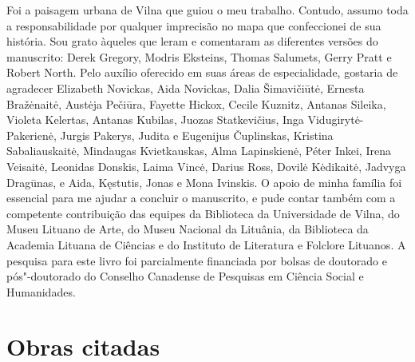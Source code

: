 Foi a paisagem urbana de Vilna que guiou o meu trabalho. Contudo, assumo
toda a responsabilidade por qualquer imprecisão no mapa que confeccionei
de sua história. Sou grato àqueles que leram e comentaram as diferentes
versões do manuscrito: Derek Gregory, Modris Eksteins, Thomas Salumets,
Gerry Pratt e Robert North. Pelo auxílio oferecido em suas áreas de
especialidade, gostaria de agradecer Elizabeth Novickas, Aida Novickas,
Dalia Šimavičiūtė, Ernesta Bražėnaitė, Austėja Pečiūra, Fayette Hickox,
Cecile Kuznitz, Antanas Sileika, Violeta Kelertas, Antanas Kubilas,
Juozas Statkevičius, Inga Vidugirytė-Pakerienė, Jurgis Pakerys, Judita e
Eugenijus Čuplinskas, Kristina Sabaliauskaitė, Mindaugas Kvietkauskas,
Alma Lapinskienė, Péter Inkei, Irena Veisaitė, Leonidas Donskis, Laima
Vincė, Darius Ross, Dovilė Kėdikaitė, Jadvyga Dragūnas, e Aida,
Kęstutis, Jonas e Mona Ivinskis. O apoio de minha família foi essencial
para me ajudar a concluir o manuscrito, e pude contar também com a
competente contribuição das equipes da Biblioteca da Universidade de
Vilna, do Museu Lituano de Arte, do Museu Nacional da Lituânia, da
Biblioteca da Academia Lituana de Ciências e do Instituto de Literatura
e Folclore Lituanos. A pesquisa para este livro foi parcialmente
financiada por bolsas de doutorado e pós"-doutorado do Conselho Canadense
de Pesquisas em Ciência Social e Humanidades.


\chapter{Obras citadas}

